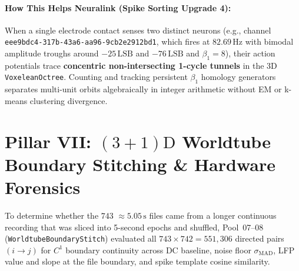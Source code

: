 \documentclass[11pt,letterpaper]{article}
\newcommand{\lean}[1]{\nolinkurl{#1}}
\theoremstyle{definition}
\begin{document}
\paragraph{How This Helps Neuralink (Spike Sorting Upgrade 4):}
When a single electrode contact senses two distinct neurons (e.g., channel \texttt{eee9bdc4-317b-43a6-aa96-9cb2e2912bd1}, which fires at $82.69\,\text{Hz}$ with bimodal amplitude troughs around $-25\,\text{LSB}$ and $-76\,\text{LSB}$ and $\beta_1 = 8$), their action potentials trace \textbf{concentric non-intersecting 1-cycle tunnels} in the 3D \texttt{VoxeleanOctree}. Counting and tracking persistent $\beta_1$ homology generators separates multi-unit orbits algebraically in integer arithmetic without EM or k-means clustering divergence.

\section[Pillar VII: (3+1)D Worldtube Stitching \& Hardware Forensics]{Pillar VII: $(3+1)\text{D}$ Worldtube Boundary Stitching \& Hardware Forensics}

To determine whether the $743$ $\approx 5.05\,\text{s}$ files came from a longer continuous recording that was sliced into 5-second epochs and shuffled, Pool~07--08 (\lean{WorldtubeBoundaryStitch}) evaluated all $743 \times 742 = 551{,}306$ directed pairs $(i \to j)$ for $C^1$ boundary continuity across DC baseline, noise floor $\sigma_{\mathrm{MAD}}$, LFP value and slope at the file boundary, and spike template cosine similarity.
\end{document}
